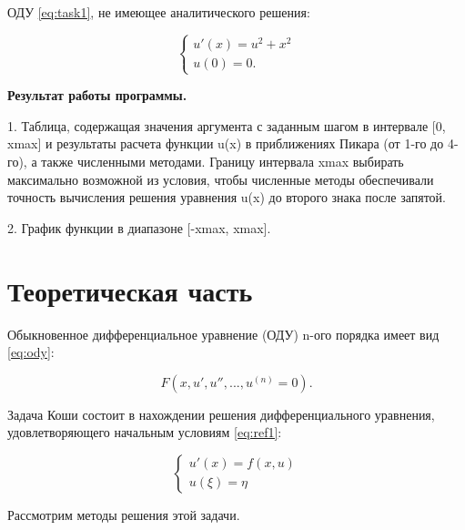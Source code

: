 \documentclass[12pt]{report}
\begin{document}
ОДУ \ref{eq:task1}, не имеющее аналитического решения:

\begin{equation}
	{\begin{cases}
			u'(x) = u^2 + x^2 \\
			u(0) = 0.
	\end{cases}}
	\label{eq:task1}
\end{equation}

\textbf{Результат работы программы.}

1. Таблица, содержащая значения аргумента с заданным шагом в интервале [0, xmax] и результаты расчета функции u(x) в приближениях Пикара (от 1-го до 4-го), а также численными методами. Границу интервала xmax выбирать максимально возможной из условия, чтобы численные методы обеспечивали точность вычисления решения уравнения u(x) до второго знака после запятой.

2. График функции в диапазоне [-xmax, xmax].

\chapter{Теоретическая часть}

Обыкновенное дифференциальное уравнение (ОДУ) n-ого порядка имеет вид \ref{eq:ody}:

\begin{equation}
	F(x, u', u'', ... , u^{(n)} = 0)
	\label{eq:ody}.
\end{equation}

Задача Коши состоит в нахождении решения дифференциального уравнения, удовлетворяющего начальным условиям \ref{eq:ref1}:


\begin{equation}
	{\begin{cases}
			u'(x) = f(x,u) \\
			u(\xi) = \eta
	\end{cases}}
	\label{eq:ref1}
\end{equation}

Рассмотрим методы решения этой задачи.


\end{document}
